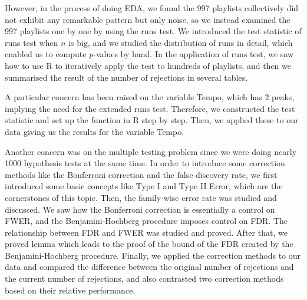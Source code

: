 \documentclass[12pt]{article}
\theoremstyle{plain}
\theoremstyle{definition}
\theoremstyle{remark}
\begin{document}
However, in the process of doing EDA, we found the 997 playlists collectively did not exhibit any remarkable pattern but only noise, so we instead examined the 997 playlists one by one by using the runs test. We introduced the test statistic of runs test when $n$ is big, and we studied the distribution of runs in detail, which enabled us to compute $p$-values by hand. In the application of runs test, we saw how to use R to iteratively apply the test to hundreds of playlists, and then we summarised the result of the number of rejections in several tables. 

A particular concern has been raised on the variable Tempo, which has 2 peaks, implying the need for the extended runs test. Therefore, we constructed the test statistic and set up the function in R step by step. Then, we applied these to our data giving us the results for the variable Tempo.

Another concern was on the multiple testing problem since we were doing nearly 1000 hypothesis tests at the same time. In order to introduce some correction methods like the Bonferroni correction and the false discovery rate, we first introduced some basic concepts like Type I and Type II Error, which are the cornerstones of this topic. Then, the family-wise error rate was studied and discussed. We saw how the Bonferroni correction is essentially a control on FWER, and the Benjamini-Hochberg procedure imposes control on FDR. The relationship between FDR and FWER was studied and proved. After that, we proved lemma which leads to the proof of the bound of the FDR created by the Benjamini-Hochberg procedure. Finally, we applied the correction methods to our data and compared the difference between the original number of rejections and the current number of rejections, and also contrasted two correction methods based on their relative performance.
\end{document}
